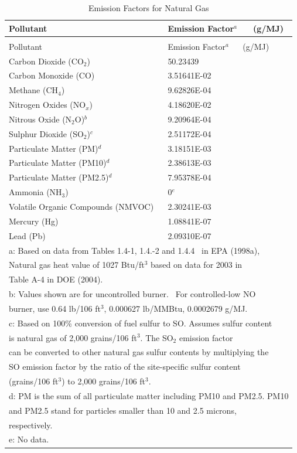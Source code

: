 \begin{longtable}[c]{p{4.5in}p{1.5in}}
\caption{Emission Factors for Natural Gas \label{table:emission-factors-for-natural-gas}} \tabularnewline
\toprule 
Pollutant & Emission Factor\(^a\)  ~~ (g/MJ) \tabularnewline
\midrule
\endfirsthead

\caption[]{Emission Factors for Natural Gas} \tabularnewline
\toprule 
Pollutant & Emission Factor\(^a\)  ~~ (g/MJ) \tabularnewline
\midrule
\endhead

Carbon Dioxide (CO\(_2\)) & 50.23439 \tabularnewline
Carbon Monoxide (CO) & 3.51641E-02 \tabularnewline
Methane (CH\(_4\)) & 9.62826E-04 \tabularnewline
Nitrogen Oxides (NO\(_x\)) & 4.18620E-02 \tabularnewline
Nitrous Oxide (N\(_2\)O)\(^b\) & 9.20964E-04 \tabularnewline
Sulphur Dioxide (SO\(_2\))\(^c\) & 2.51172E-04 \tabularnewline
Particulate Matter (PM)\(^d\) & 3.18151E-03 \tabularnewline
Particulate Matter (PM10)\(^d\) & 2.38613E-03 \tabularnewline
Particulate Matter (PM2.5)\(^d\) & 7.95378E-04 \tabularnewline
Ammonia (NH\(_3\)) & 0\(^e\) \tabularnewline
Volatile Organic Compounds (NMVOC) & 2.30241E-03 \tabularnewline
Mercury (Hg) & 1.08841E-07 \tabularnewline
Lead (Pb) & 2.09310E-07 \tabularnewline
\midrule
\multicolumn{2}{l}{a: Based on data from Tables 1.4-1, 1.4.-2 and 1.4.4~ in EPA (1998a),} \tabularnewline
\multicolumn{2}{l}{Natural gas heat value of 1027 Btu/ft\(^3\) based on data for 2003 in} \tabularnewline
\multicolumn{2}{l}{Table A-4 in DOE (2004).} \tabularnewline
\multicolumn{2}{l}{b: Values shown are for uncontrolled burner.~ For controlled-low NO } \tabularnewline
\multicolumn{2}{l}{burner, use 0.64 lb/106 ft\(^3\), 0.000627 lb/MMBtu, 0.0002679 g/MJ.} \tabularnewline
\multicolumn{2}{l}{c: Based on 100\% conversion of fuel sulfur to SO. Assumes sulfur content} \tabularnewline
\multicolumn{2}{l}{is natural gas of 2,000 grains/106 ft\(^3\). The SO\(_2\) emission factor} \tabularnewline
\multicolumn{2}{l}{can be converted to other natural gas sulfur contents by multiplying the} \tabularnewline
\multicolumn{2}{l}{SO emission factor by the ratio of the site-specific sulfur content} \tabularnewline
\multicolumn{2}{l}{(grains/106 ft\(^3\)) to 2,000 grains/106 ft\(^3\).} \tabularnewline
\multicolumn{2}{l}{d: PM is the sum of all particulate matter including PM10 and PM2.5. PM10} \tabularnewline
\multicolumn{2}{l}{and PM2.5 stand for particles smaller than 10 and 2.5 microns,} \tabularnewline
\multicolumn{2}{l}{respectively.} \tabularnewline
\multicolumn{2}{l}{e: No data.} \tabularnewline
\bottomrule
\end{longtable}

